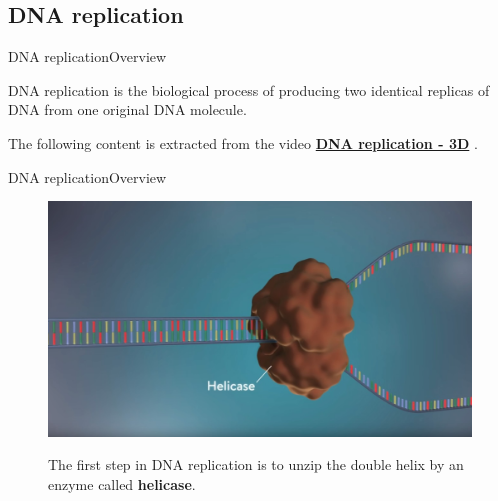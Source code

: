 \documentclass[10pt]{beamer}
\begin{document}
{%
\subsection{DNA replication}

\begin{frame}{DNA replication}{Overview}
\begin{block}{}
	DNA replication is the biological process of producing two identical replicas of DNA from one original DNA molecule.
\end{block}

\begin{block}{}
	The following content is extracted from the video \href{https://www.youtube.com/watch?v=TNKWgcFPHqw}{\textbf{DNA replication - 3D}} \cite{MITx2020}.
\end{block}
\end{frame}

\begin{frame}{DNA replication}{Overview}
	\begin{figure}[]
		\centering
		\includegraphics[width=\textwidth,height=0.6\textheight,keepaspectratio]{img/introduction/dna30.jpg}
		\label{img:mot2}
		\caption{The first step in DNA replication is to unzip the double helix by an enzyme called \textbf{helicase}.}
	\end{figure}
\end{frame}

}
\end{document}
